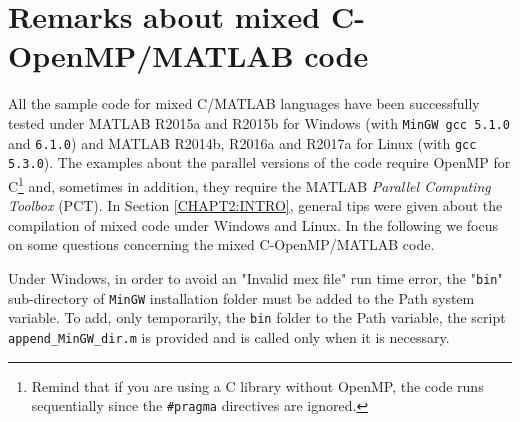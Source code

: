 \documentclass[a4paper,10pt]{report}%
\begin{document}
\section{Remarks about mixed C-OpenMP/MATLAB code}
All the sample code for mixed C/MATLAB languages have been successfully tested under MATLAB R2015a and R2015b
for Windows (with {\tt MinGW gcc 5.1.0} and {\tt 6.1.0}) and MATLAB R2014b, R2016a and R2017a for Linux (with
{\tt gcc 5.3.0}).
The examples about the parallel versions of the code require OpenMP for C\footnote{ Remind that if you are
using a C library without OpenMP, the code runs sequentially since the {\tt \#pragma} directives are ignored.}
and, sometimes in addition, they require the MATLAB {\em Parallel Computing Toolbox} (PCT).
In Section \ref{CHAPT2:INTRO}, general tips were given about the compilation of mixed code under Windows and
Linux.
In the following we focus on some questions concerning the mixed C-OpenMP/MATLAB code.

Under Windows, in order to avoid an "Invalid mex file" run time error, the "{\tt bin}" sub-directory of
{\tt MinGW} installation folder must be added to the Path system variable. To add, only temporarily, the
{\tt bin} folder to the Path variable, the script {\tt append\_MinGW\_dir.m} is provided and is called
only when it is necessary.
\end{document}
